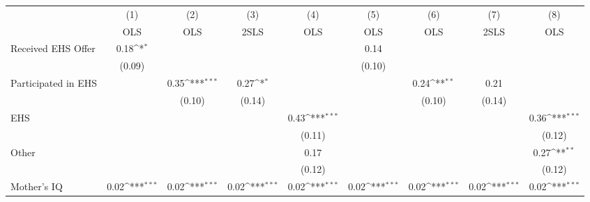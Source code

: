 {
\def\sym#1{\ifmmode^{#1}\else\(^{#1}\)\fi}
\begin{tabular}{l*{8}{c}}
\hline\hline
                    &\multicolumn{1}{c}{(1)}&\multicolumn{1}{c}{(2)}&\multicolumn{1}{c}{(3)}&\multicolumn{1}{c}{(4)}&\multicolumn{1}{c}{(5)}&\multicolumn{1}{c}{(6)}&\multicolumn{1}{c}{(7)}&\multicolumn{1}{c}{(8)}\\
                    &\multicolumn{1}{c}{OLS}&\multicolumn{1}{c}{OLS}&\multicolumn{1}{c}{2SLS}&\multicolumn{1}{c}{OLS}&\multicolumn{1}{c}{OLS}&\multicolumn{1}{c}{OLS}&\multicolumn{1}{c}{2SLS}&\multicolumn{1}{c}{OLS}\\
\hline
Received EHS Offer  &        0.18\sym{*}  &                     &                     &                     &        0.14         &                     &                     &                     \\
                    &      (0.09)         &                     &                     &                     &      (0.10)         &                     &                     &                     \\
[1em]
Participated in EHS &                     &        0.35\sym{***}&        0.27\sym{*}  &                     &                     &        0.24\sym{**} &        0.21         &                     \\
                    &                     &      (0.10)         &      (0.14)         &                     &                     &      (0.10)         &      (0.14)         &                     \\
[1em]
EHS                 &                     &                     &                     &        0.43\sym{***}&                     &                     &                     &        0.36\sym{***}\\
                    &                     &                     &                     &      (0.11)         &                     &                     &                     &      (0.12)         \\
[1em]
Other               &                     &                     &                     &        0.17         &                     &                     &                     &        0.27\sym{**} \\
                    &                     &                     &                     &      (0.12)         &                     &                     &                     &      (0.12)         \\
[1em]
Mother's IQ         &        0.02\sym{***}&        0.02\sym{***}&        0.02\sym{***}&        0.02\sym{***}&        0.02\sym{***}&        0.02\sym{***}&        0.02\sym{***}&        0.02\sym{***}\\

\end{tabular}}
